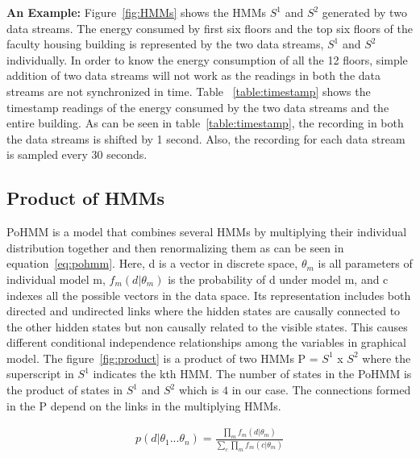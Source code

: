 \documentclass{acm_proc_article-sp}
\begin{document}
\noindent \textbf{An Example:} Figure~\ref{fig:HMMs} shows the HMMs $S^1$ and $S^2$ generated by two data streams. The energy consumed by first six floors and the top six floors of the faculty housing building is represented by the two data streams, $S^1$ and $S^2$ individually. In order to know the energy consumption of all the 12 floors, simple addition of two data streams will not work as the readings in both the data streams are not synchronized in time. Table ~\ref{table:timestamp} shows the timestamp readings of the energy consumed by the two data streams and the entire building. As can be seen in table~\ref{table:timestamp}, the recording in both the data streams is shifted by 1 second. Also, the recording for each data stream is sampled every 30 seconds.


\subsection{Product of HMMs}
\label {pohmm}
PoHMM is a model that combines several HMMs by multiplying their individual distribution together and then renormalizing them as can be seen in equation~\ref{eq:pohmm}. Here, d is a vector in discrete space, $\theta_{m}$ is all parameters of individual model m, $f_{m}(d | \theta_{m})$ is the probability of d under model m, and c indexes all the possible vectors in the data space. Its representation includes both directed and undirected links where the hidden states are causally connected to the other hidden states but non causally related to the visible states. This causes different conditional independence relationships among the variables in graphical model. 
The figure~\ref{fig:product} is a product of two HMMs P = $S^1$ x $S^2$ where the superscript in $S^1$ indicates the kth HMM. The number of states in the PoHMM is the product of states in $S^1$ and $S^2$ which is $4$ in our case. The connections formed in the P depend on the links in the multiplying HMMs. 

\begin{eqnarray}
p(d|\theta_{1}...\theta_{n}) = \frac{\prod_{m}f_m(d|\theta_{m})}{\sum_{c}\prod_{m}f_m(c|\theta_{m})}
\label{eq:pohmm}
\end{eqnarray}
\end{document}
